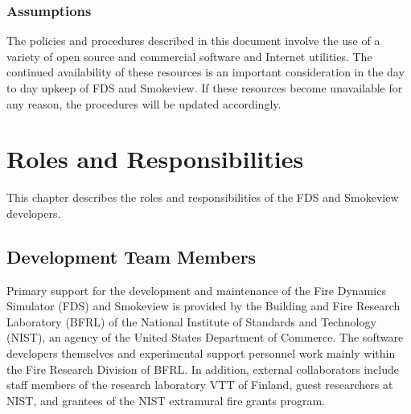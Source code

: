 \documentclass[11pt]{book}
\begin{document}
\subsection{Assumptions}

The policies and procedures described in this document involve the use of a variety of open source and commercial software and Internet utilities.
The continued availability of these resources is an important consideration in the day to day upkeep of FDS and Smokeview.
If these resources become unavailable for any reason, the procedures will be updated accordingly.

\chapter{Roles and Responsibilities}

This chapter describes the roles and responsibilities of the FDS and Smokeview developers.

\section{Development Team Members}

Primary support for the development and maintenance of the Fire Dynamics Simulator (FDS) and Smokeview is provided by the Building and Fire
Research Laboratory (BFRL) of the National Institute of Standards and Technology (NIST), an agency of the United States Department of Commerce.
The software developers themselves and experimental support personnel
work mainly within the Fire Research Division of BFRL. In addition, external collaborators include staff members of the research laboratory VTT of Finland, guest researchers at NIST,
and grantees of the NIST extramural fire grants program.
\end{document}
